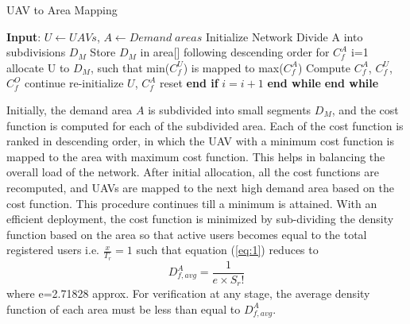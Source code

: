 \documentclass[journal]{IEEEtran}
\begin{document}
\begin{algorithm}[!ht]
\fontsize{7}{9}\selectfont
\caption{UAV to Area Mapping}
\label{algo1}
\begin{algorithmic}[1]
\State \textbf{Input}: $U \longleftarrow UAVs$, $A \longleftarrow Demand \;areas$
\State Initialize Network
\State Divide A into subdivisions $D_{M}$
\State Store $D_{M}$ in area[] following descending order for $C_{f}^{A}$
\State i=1
\State allocate U to $D_{M}$, such that min($C_{f}^{U}$) is mapped to max($C_{f}^{A}$)
\State Compute $C_{f}^{A}$, $C_{f}^{U}$, $C_{f}^{O}$
\State continue
\Else
\State re-initialize $U$, $C_{f}^{A}$
\State reset
\EndIf
\State \textbf{end if}
\State $i=i+1$
\EndWhile
\State \textbf{end while}
\EndWhile
\State \textbf{end while}
\end{algorithmic}
\end{algorithm}
Initially, the demand area $A$ is subdivided into small segments $D_{M}$, and the cost function is computed for each of the subdivided area. Each of the cost function is ranked in descending order, in which the UAV with a minimum cost function is mapped to the area with maximum cost function. This helps in balancing the overall load of the network. After initial allocation, all the cost functions are recomputed, and UAVs are mapped to the next high demand area based on the cost function. This procedure continues till a minimum is attained. With an efficient deployment, the cost function is minimized by sub-dividing the density function based on the area so that active users becomes equal to the total registered users i.e. $\frac{x}{T_{r}}=1$ such that equation (\ref{eq:1}) reduces to
\begin{equation}
D_{f,avg}^{A}=\frac{1}{e\times S_{r}!}
\end{equation}
where e=2.71828 approx. For verification at any stage, the average density function of each area must be less than equal to $D_{f,avg}^{A}$.
\end{document}
